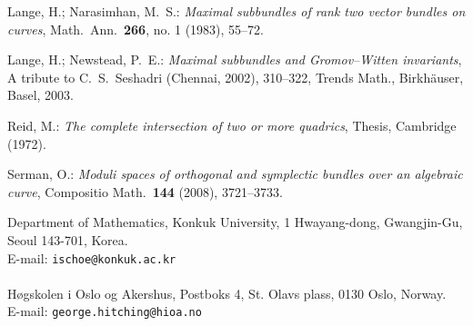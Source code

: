 \documentclass[10pt]{amsart}
\numberwithin{equation}{section}
\begin{document}
\begin{thebibliography}{99}


 Lange, H.; Narasimhan, M.\ S.: \textsl{Maximal subbundles of rank two vector bundles on curves}, Math.\ Ann.\ \textbf{266}, no. 1 (1983), 55--72.

 Lange, H.; Newstead, P.\ E.: \textsl{Maximal subbundles and Gromov--Witten invariants}, A tribute to C.\ S.\ Seshadri (Chennai, 2002), 310--322, Trends Math., Birkh\"auser, Basel, 2003.

 Reid, M.: \textsl{The complete intersection of two or more quadrics}, Thesis, Cambridge (1972).


 Serman, O.: \textsl{Moduli spaces of orthogonal and symplectic bundles over an algebraic curve}, Compositio Math.\ \textbf{144} (2008), 3721--3733.

\end{thebibliography}

\noindent \footnotesize{Department of Mathematics, Konkuk University, 1 Hwayang-dong, Gwangjin-Gu, Seoul 143-701, Korea.\\
E-mail: \texttt{ischoe@konkuk.ac.kr}\\
\\
H\o gskolen i Oslo og Akershus, Postboks 4, St. Olavs plass, 0130 Oslo, Norway.\\
E-mail: \texttt{george.hitching@hioa.no}}
\end{document}
